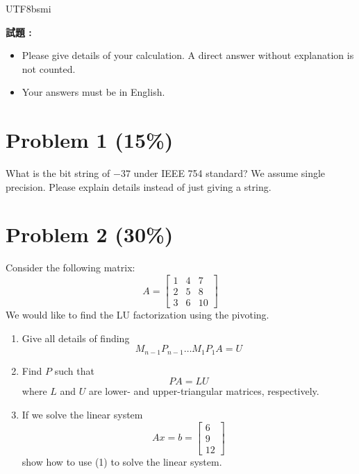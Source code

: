 \documentclass[12pt,a4paper]{article}
\begin{document}
\begin{CJK*}{UTF8}{bsmi}

\noindent \textbf{試題 :}

\begin{itemize}
    \item Please give details of your calculation. A direct answer without explanation is not counted.
    \item Your answers must be in English.
\end{itemize}

\vspace{0.5cm}

\section*{Problem 1 (15\%)}
What is the bit string of $-37$ under IEEE 754 standard? We assume single precision. Please explain details instead of just giving a string.

\vspace{0.5cm}

\section*{Problem 2 (30\%)}
Consider the following matrix:
\[
A = \begin{bmatrix}
1 & 4 & 7 \\
2 & 5 & 8 \\
3 & 6 & 10
\end{bmatrix}
\]
We would like to find the LU factorization using the pivoting.

\begin{enumerate}
    \item[(a)] Give all details of finding
    \[ M_{n-1} P_{n-1} \dots M_1 P_1 A = U \]
    
    \item[(b)] Find $P$ such that
    \begin{equation}
    PA = LU \label{eq1}
    \end{equation}
    where $L$ and $U$ are lower- and upper-triangular matrices, respectively.
    
    \item[(c)] If we solve the linear system
    \[
    Ax = b = \begin{bmatrix} 6 \\ 9 \\ 12 \end{bmatrix}
    \]
    show how to use (1) to solve the linear system.
\end{enumerate}


\end{CJK*}
\end{document}
